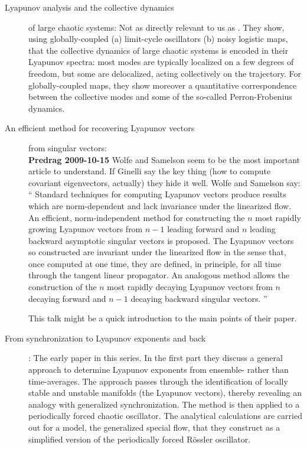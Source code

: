 \begin{description}
\item[Lyapunov analysis and the collective dynamics]
of large chaotic systems:
Not as directly relevant to us as .
They show, using globally-coupled (a) limit-cycle oscillators
(b) noisy logistic maps, that the collective dynamics
of large chaotic systems is encoded in their Lyapunov spectra:
most modes are typically localized on a few degrees of freedom,
but some are delocalized, acting collectively on the trajectory.
For globally-coupled maps, they show moreover a quantitative
correspondence between the collective modes and some of the
so-called Perron-Frobenius dynamics.


\item[An efficient method for recovering Lyapunov vectors] from
singular vectors:
\\
{\bf Predrag 2009-10-15} Wolfe
and Samelson seem to be the most important article to
understand. If Ginelli \etal{} say the key
thing (how to compute covariant eigenvectors, actually) they
hide it well.
Wolfe and Samelson say: `` Standard techniques for computing
Lyapunov vectors produce results which are norm-dependent and
lack invariance under the linearized flow. An efficient,
norm-independent method for constructing the $n$ most rapidly
growing Lyapunov vectors from $n\!-\!1$ leading forward and  $n$
leading backward asymptotic singular vectors is proposed. The
Lyapunov vectors so constructed are invariant under the
linearized flow in the sense that, once computed at one time,
they are defined, in principle, for all time through the
tangent linear propagator.
			\toCB
An analogous method allows the
construction of the $n$ most rapidly decaying Lyapunov vectors
from $n$ decaying forward and $n\!-\!1$ decaying backward singular
vectors. ''

{This talk} might be a quick introduction to the main points of their
paper.

\item[From synchronization to Lyapunov exponents and
              back]:
The early paper in this series.
In the first part they discuss a general approach to determine
Lyapunov exponents from ensemble- rather than time-averages.
The approach passes through the identification of locally
stable and unstable manifolds (the Lyapunov vectors), thereby
revealing an analogy with generalized synchronization. The
method is then applied to a periodically forced chaotic
oscillator. The
analytical calculations are carried out for a model, the
generalized special flow, that they construct as a simplified
version of the periodically forced R\"ossler oscillator.


\end{description}
